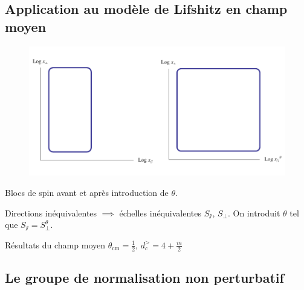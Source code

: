 \documentclass[xcolor=dvipsnames]{beamer}
\begin{document}
\subsection{Application au modèle de Lifshitz en champ moyen}
\begin{frame}

\begin{figure}[htp]
\centering
\includegraphics[scale=0.4]{img/blockspin_theta.pdf}
\label{}
\end{figure}
\begin{center}
Blocs de spin avant et après introduction de $\theta$.
\end{center}

\begin{block}{}
Directions inéquivalentes $\implies$ échelles inéquivalentes $S_\sslash$, $S_\perp$. \newline On introduit $\theta$ tel que $S_\sslash = S_\perp^\theta$. 
\end{block} 

\begin{block}{Résultats du champ moyen}
\centering
$\theta_\text{cm} = \frac{1}{2}$, $d_c^> = 4 + \frac{m}{2}$
\end{block}

\end{frame}

\subsection{Le groupe de normalisation non perturbatif}
\end{document}
